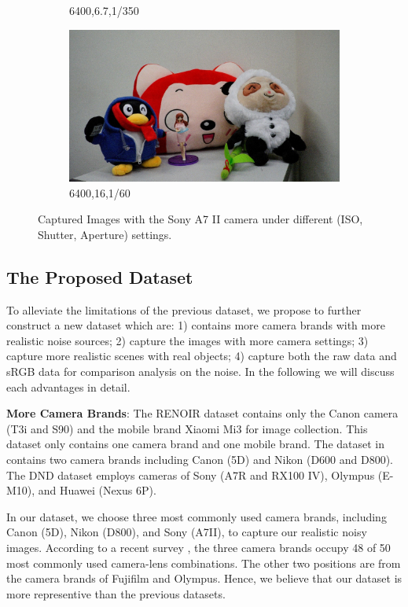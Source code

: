 \begin{figure}
\begin{subfigure}[t]{0.32\textwidth}
		\caption{6400,6.7,1/350}
    \end{subfigure}
    \hfill
    \begin{subfigure}[t]{0.32\textwidth}
        \centering
        \includegraphics[width=1\textwidth]{images/dataset/6400_16_1-60.jpg}
		\caption{6400,16,1/60}
    \end{subfigure}
    \caption{Captured Images with the Sony A7 II camera under different (ISO, Shutter, Aperture) settings.}
    \label{fig6-1}
\end{figure}


\subsection{The Proposed Dataset}
To alleviate the limitations of the previous dataset, we propose to further construct a new dataset which are: 1) contains more camera brands with more realistic noise sources;  2) capture the images with more camera settings; 3) capture more realistic scenes with real objects; 4) capture both the raw data and sRGB data for comparison analysis on the noise. In the following we will discuss each advantages in detail.

\textbf{More Camera Brands}: The RENOIR dataset \cite{RENOIR2014} contains only the Canon camera (T3i and S90) and the mobile brand Xiaomi Mi3 for image collection. This dataset only contains one camera brand and one mobile brand. The dataset in \cite{crosschannel2016} contains two camera brands including Canon (5D) and Nikon (D600 and D800). The DND dataset \cite{dnd2017} employs cameras of Sony (A7R and RX100 IV),  Olympus (E-M10), and Huawei (Nexus 6P).

In our dataset, we choose three most commonly used camera brands, including Canon (5D), Nikon (D800), and Sony (A7II), to capture our realistic noisy images. According to a recent survey \cite{commoncamera}, the three camera brands occupy 48 of 50 most commonly used camera-lens combinations. The other two positions are from the camera brands of Fujifilm and Olympus. Hence, we believe that our dataset is more representive than the previous datasets.

